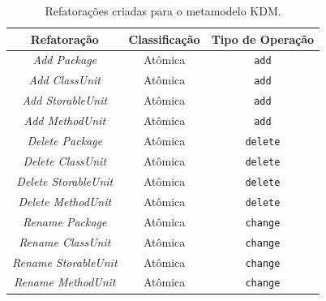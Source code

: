 
\begin{table}[h]
\caption{Refatorações criadas para o metamodelo KDM.\label{tab:refatoringsCatalogo}}
\begin{center}
\begin{tabular}{ | m{4.5cm} | m{2.5cm} | m{4cm}| } 
\hline
\multicolumn{1}{|c|}{Refatoração} & \multicolumn{1}{|c|}{Classificação} & \multicolumn{1}{|c|}{Tipo de Operação}\\ 
\hline
\multicolumn{1}{|c|}{\textit{Add Package}} &  \multicolumn{1}{c|}{Atômica} & \multicolumn{1}{c|}{\texttt{add}}\\ 
\hline
\multicolumn{1}{|c|}{\textit{Add ClassUnit}} &  \multicolumn{1}{c|}{Atômica} & \multicolumn{1}{c|}{\texttt{add}}\\ 
\hline
\multicolumn{1}{|c|}{\textit{Add StorableUnit}} &  \multicolumn{1}{c|}{Atômica} & \multicolumn{1}{c|}{\texttt{add}}\\ 
\hline
\multicolumn{1}{|c|}{\textit{Add MethodUnit}} &  \multicolumn{1}{c|}{Atômica} & \multicolumn{1}{c|}{\texttt{add}}\\ 
\hline
\multicolumn{1}{|c|}{\textit{Delete Package}} &  \multicolumn{1}{c|}{Atômica} & \multicolumn{1}{c|}{\texttt{delete}}\\ 
\hline
\multicolumn{1}{|c|}{\textit{Delete ClassUnit}} &  \multicolumn{1}{c|}{Atômica} & \multicolumn{1}{c|}{\texttt{delete}}\\ 
\hline
\multicolumn{1}{|c|}{\textit{Delete StorableUnit}} &  \multicolumn{1}{c|}{Atômica} & \multicolumn{1}{c|}{\texttt{delete}}\\ 
\hline
\multicolumn{1}{|c|}{\textit{Delete MethodUnit}} &  \multicolumn{1}{c|}{Atômica} & \multicolumn{1}{c|}{\texttt{delete}}\\ 
\hline
\multicolumn{1}{|c|}{\textit{Rename Package}} &  \multicolumn{1}{c|}{Atômica} & \multicolumn{1}{c|}{\texttt{change}}\\ 
\hline
\multicolumn{1}{|c|}{\textit{Rename ClassUnit}} &  \multicolumn{1}{c|}{Atômica} & \multicolumn{1}{c|}{\texttt{change}}\\ 
\hline
\multicolumn{1}{|c|}{\textit{Rename StorableUnit}} & \multicolumn{1}{c|}{Atômica} & \multicolumn{1}{c|}{\texttt{change}}\\ 
\hline
\multicolumn{1}{|c|}{\textit{Rename MethodUnit}} &  \multicolumn{1}{c|}{Atômica} & \multicolumn{1}{c|}{\texttt{change}}\\ 

\end{tabular}
\end{center}
\end{table}
